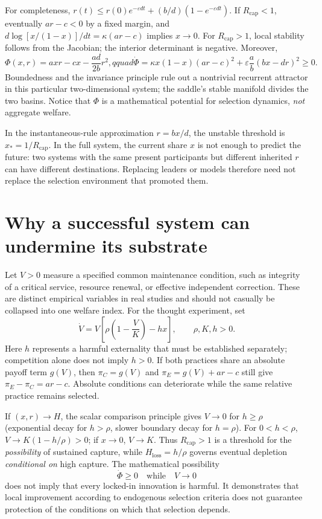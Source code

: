 \documentclass[11pt]{article}
\begin{document}
For completeness, $r(t)\leq r(0)e^{-\varepsilon dt}+(b/d)(1-e^{-\varepsilon dt})$. If $R_{\mathrm{cap}}<1$, eventually $ar-c<0$ by a fixed margin, and $d\log[x/(1-x)]/dt=\kappa(ar-c)$ implies $x\to0$. For $R_{\mathrm{cap}}>1$, local stability follows from the Jacobian; the interior determinant is negative. Moreover,
\begin{equation}\label{eq:potential}
\Phi(x,r)=axr-cx-\frac{ad}{2b}r^2,qquad
\dot\Phi=\kappa x(1-x)(ar-c)^2+\varepsilon\frac{a}{b}(bx-dr)^2\geq0.
\end{equation}
Boundedness and the invariance principle rule out a nontrivial recurrent attractor in this particular two-dimensional system; the saddle's stable manifold divides the two basins. Notice that $\Phi$ is a mathematical potential for selection dynamics, \emph{not} aggregate welfare.

In the instantaneous-rule approximation $r=bx/d$, the unstable threshold is $x_*=1/R_{\mathrm{cap}}$. In the full system, the current share $x$ is not enough to predict the future: two systems with the same present participants but different inherited $r$ can have different destinations. Replacing leaders or models therefore need not replace the selection environment that promoted them.

\section{Why a successful system can undermine its substrate}

Let $V>0$ measure a specified common maintenance condition, such as integrity of a critical service, resource renewal, or effective independent correction. These are distinct empirical variables in real studies and should not casually be collapsed into one welfare index. For the thought experiment, set
\begin{equation}\label{eq:substrate}
\dot V=V\left[\rho\left(1-\frac{V}{K}\right)-hx\right],\qquad \rho,K,h>0.
\end{equation}
Here $h$ represents a harmful externality that must be established separately; competition alone does not imply $h>0$. If both practices share an absolute payoff term $g(V)$, then $\pi_C=g(V)$ and $\pi_E=g(V)+ar-c$ still give $\pi_E-\pi_C=ar-c$. Absolute conditions can deteriorate while the same relative practice remains selected.

If $(x,r)\to H$, the scalar comparison principle gives $V\to0$ for $h\geq\rho$ (exponential decay for $h>\rho$, slower boundary decay for $h=\rho$). For $0<h<\rho$, $V\to K(1-h/\rho)>0$; if $x\to0$, $V\to K$. Thus $R_{\mathrm{cap}}>1$ is a threshold for the \emph{possibility} of sustained capture, while $H_{\mathrm{loss}}=h/\rho$ governs eventual depletion \emph{conditional on} high capture. The mathematical possibility
\begin{equation}
\dot\Phi\geq0\quad\text{while}\quad V\to0
\end{equation}
does not imply that every locked-in innovation is harmful. It demonstrates that local improvement according to endogenous selection criteria does not guarantee protection of the conditions on which that selection depends.
\end{document}
